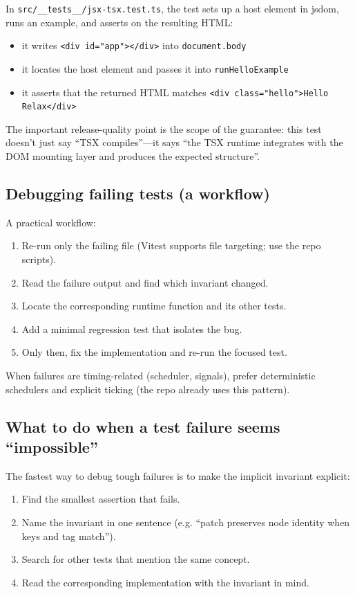 In \texttt{src/\_\_tests\_\_/jsx-tsx.test.ts}, the test sets up a host element in jsdom, runs an example, and asserts on the resulting HTML:

\begin{itemize}
\item it writes \texttt{<div id="app"></div>} into \texttt{document.body}
\item it locates the host element and passes it into \texttt{runHelloExample}
\item it asserts that the returned HTML matches \texttt{<div class="hello">Hello Relax</div>}
\end{itemize}

The important release-quality point is the scope of the guarantee:
this test doesn't just say ``TSX compiles''---it says ``the TSX runtime integrates with the DOM mounting layer and produces the expected structure''.

\subsection{Debugging failing tests (a workflow)}

A practical workflow:

\begin{enumerate}
\item Re-run only the failing file (Vitest supports file targeting; use the repo scripts).
\item Read the failure output and find which invariant changed.
\item Locate the corresponding runtime function and its other tests.
\item Add a minimal regression test that isolates the bug.
\item Only then, fix the implementation and re-run the focused test.
\end{enumerate}

When failures are timing-related (scheduler, signals), prefer deterministic schedulers and explicit ticking (the repo already uses this pattern).

\subsection{What to do when a test failure seems ``impossible''}

The fastest way to debug tough failures is to make the implicit invariant explicit:

\begin{enumerate}
\item Find the smallest assertion that fails.
\item Name the invariant in one sentence (e.g. ``patch preserves node identity when keys and tag match'').
\item Search for other tests that mention the same concept.
\item Read the corresponding implementation with the invariant in mind.
\end{enumerate}

